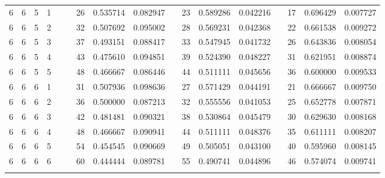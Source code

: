 \begin{appendix}
\begin{longtable}[h]{rrrcccccccccccccc}
6	&	6	&	5	&	1	&&&	26	&	0.535714	&	0.082947	&&	23	&	0.589286	&	0.042216	&&	17	&	0.696429	&	0.007727	\\
6	&	6	&	5	&	2	&&&	32	&	0.507692	&	0.095002	&&	28	&	0.569231	&	0.042368	&&	22	&	0.661538	&	0.009272	\\
6	&	6	&	5	&	3	&&&	37	&	0.493151	&	0.088417	&&	33	&	0.547945	&	0.041732	&&	26	&	0.643836	&	0.008054	\\
6	&	6	&	5	&	4	&&&	43	&	0.475610	&	0.094851	&&	39	&	0.524390	&	0.048227	&&	31	&	0.621951	&	0.008874	\\
6	&	6	&	5	&	5	&&&	48	&	0.466667	&	0.086446	&&	44	&	0.511111	&	0.045656	&&	36	&	0.600000	&	0.009533	\\
6	&	6	&	6	&	1	&&&	31	&	0.507936	&	0.098636	&&	27	&	0.571429	&	0.044191	&&	21	&	0.666667	&	0.009750	\\
6	&	6	&	6	&	2	&&&	36	&	0.500000	&	0.087213	&&	32	&	0.555556	&	0.041053	&&	25	&	0.652778	&	0.007871	\\
6	&	6	&	6	&	3	&&&	42	&	0.481481	&	0.090321	&&	38	&	0.530864	&	0.045479	&&	30	&	0.629630	&	0.008168	\\
6	&	6	&	6	&	4	&&&	48	&	0.466667	&	0.090941	&&	44	&	0.511111	&	0.048376	&&	35	&	0.611111	&	0.008207	\\
6	&	6	&	6	&	5	&&&	54	&	0.454545	&	0.090669	&&	49	&	0.505051	&	0.043100	&&	40	&	0.595960	&	0.008145	\\
6	&	6	&	6	&	6	&&&	60	&	0.444444	&	0.089781	&&	55	&	0.490741	&	0.044896	&&	46	&	0.574074	&	0.009741	\\
\hline
\vspace{0.02cm}
\end{longtable}

\end{appendix}

\address{Javier Alcaraz\\
  Center of Operations Research, Miguel Hern\'andez University\\
  Avda. Universidad sn, 03202 Elche (Spain)\\
  E-mail: \\
}

\vspace{-0.1cm}

\address{Laura Anton-Sanchez\\
	Center of Operations Research, Miguel Hern\'andez University\\
  Avda. Universidad sn, 03202 Elche (Spain)\\
  E-mail: \\
}

\vspace{-0.1cm}

\address{Juan Francisco Monge\\
	Center of Operations Research, Miguel Hern\'andez University\\
  Avda. Universidad sn, 03202 Elche (Spain)\\
  E-mail: \\
}

